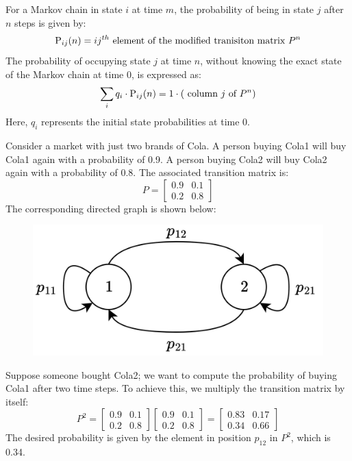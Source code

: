 For a Markov chain in state $i$ at time $m$, the probability of being in state $j$ after $n$ steps is given by:
\[\text{P}_{ij}(n)=ij^{th} \textnormal{ element of the modified tranisiton matrix }P^n\]
The probability of occupying state $j$ at time $n$, without knowing the exact state of the Markov chain at time 0, is expressed as:
\[\sum_i q_i\cdot\text{P}_{ij}(n)=1 \cdot (\textnormal{ column } j \textnormal{ of }P^n) \]
Here, $q_i$ represents the initial state probabilities at time 0.
\begin{example}
    Consider a market with just two brands of Cola. 
    A person buying Cola1 will buy Cola1 again with a probability of 0.9. 
    A person buying Cola2 will buy Cola2 again with a probability of 0.8. 
    The associated transition matrix is:
    \[P=
    \begin{bmatrix}
        0.9 & 0.1 \\
        0.2 & 0.8
    \end{bmatrix}\]
    The corresponding directed graph is shown below:
    \begin{figure}[H]
        \centering
        \includegraphics[width=0.5\linewidth]{images/cola.png}
    \end{figure}
    Suppose someone bought Cola2; we want to compute the probability of buying Cola1 after two time steps. 
    To achieve this, we multiply the transition matrix by itself:
    \[P^2=
    \begin{bmatrix}
        0.9 & 0.1 \\
        0.2 & 0.8
    \end{bmatrix}
    \begin{bmatrix}
        0.9 & 0.1 \\
        0.2 & 0.8
    \end{bmatrix}
    =
    \begin{bmatrix}
        0.83 & 0.17 \\
        0.34 & 0.66
    \end{bmatrix}\]
    The desired probability is given by the element in position $p_{12}$ in $P^2$, which is 0.34.
    

\end{example}
